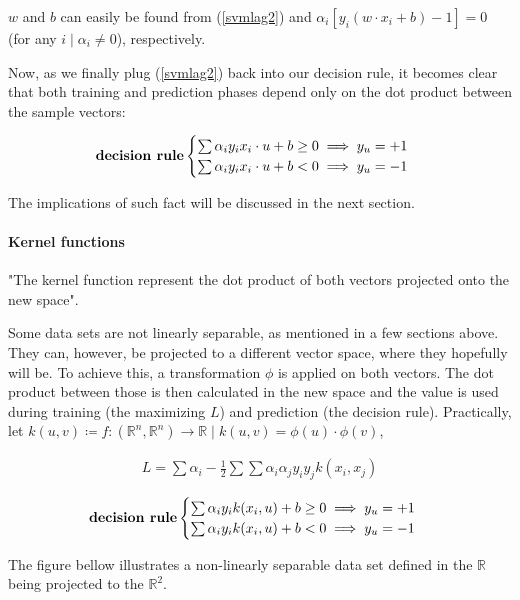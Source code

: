 \documentclass[12pt]{article}
\begin{document}
$w$ and $b$ can easily be found from (\ref{svmlag2}) and $\alpha_i[y_i(w \cdot x_i + b) - 1] = 0$ (for any $i \mid \alpha_i \ne 0$), respectively.

Now, as we finally plug (\ref{svmlag2}) back into our decision rule, it becomes clear that both training and prediction phases depend only on the dot product between the sample vectors: \cite{mitsvm}

$$\text{\textbf{decision rule}} \begin{cases}
	\sum\alpha_i y_i x_i \cdot u +b \geq 0 \implies y_u=+1\\
	\sum\alpha_i y_i x_i \cdot u +b < 0 \implies y_u=-1\\
\end{cases}$$

The implications of such fact will be discussed in the next section.

\paragraph{Kernel functions}

"The kernel function represent the dot product of both vectors projected onto the new space". \cite{mitsvm}

Some data sets are not linearly separable, as mentioned in a few sections above. They can, however, be projected to a different vector space, where they hopefully will be. To achieve this, a transformation $\phi$ is applied on both vectors. The dot product between those is then calculated in the new space and the value is used during training (the maximizing $L$) and prediction (the decision rule). Practically, let $k(u, v) \coloneqq f: (\mathbb{R}^n, \mathbb{R}^n) \rightarrow \mathbb{R} \mid k(u, v) = \phi(u) \cdot \phi(v)$,

\begin{gather*}
L = \sum\alpha_i -\frac{1}{2}\sum\sum\alpha_i\alpha_j y_i y_j k(x_i, x_j)
\end{gather*}

$$\text{\textbf{decision rule}} \begin{cases}
\sum\alpha_i y_i k(x_i, u) +b \geq 0 \implies y_u=+1\\
\sum\alpha_i y_i k(x_i, u) +b < 0 \implies y_u=-1\\
\end{cases}$$

The figure bellow illustrates a non-linearly separable data set defined in the $\mathbb{R}$ being projected to the $\mathbb{R}^2$.
\end{document}
